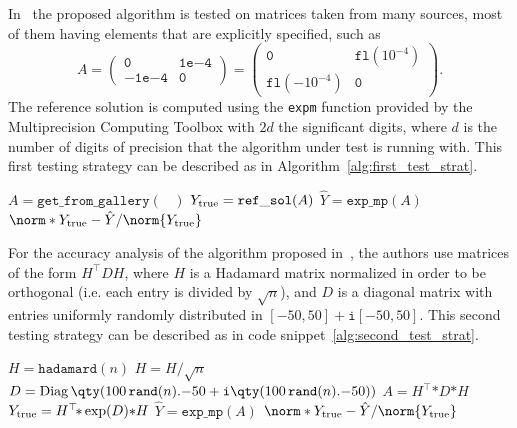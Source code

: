 In~\cite{higham:hf19_mpexpm} the proposed algorithm is tested on matrices taken from many sources, most of them having elements that are explicitly specified, such as
\begin{equation}\label{eqn:Higham_test_matrix}
	A = \begin{pmatrix}
		\mathtt{0} & \mathtt{1e{-4}}\\
		\mathtt{-1e{-4}} & \mathtt{0}
	\end{pmatrix}=
	\begin{pmatrix}
		\mathtt{0} & \mathtt{fl}(10^{-4}) \\
		\mathtt{fl}(-10^{-4}) & \mathtt{0}
	\end{pmatrix}.
\end{equation}
The reference solution is computed using  the \texttt{expm} function provided by the Multiprecision Computing Toolbox with $2d$ the significant digits, where $d$ is the number of digits of precision that the algorithm under test is running with. This first testing strategy can be described as in Algorithm~\ref{alg:first_test_strat}. 
\begin{algorithm}[H]
	\caption{\emph{First testing strategy}}
	\label{alg:first_test_strat}
	\begin{algorithmic}[1]
		\State $A = \mathtt{get\_from\_gallery}(\phantom{X})$ 
		\State $Y_{\textup{true}} = \mathtt{ref\_sol}(A)$	
		\State $\hat{Y} = \mathtt{exp\_mp}(A)$
		\State \Return $\norm*{Y_{\textup{true}}-\hat{Y}}/\norm{Y_{\textup{true}}}$
	\end{algorithmic}
\end{algorithm}

For the accuracy analysis of the algorithm proposed in~\cite{exptayotf18}, the authors use matrices of the form $H^{\top}DH$, where $H$ is a Hadamard matrix normalized in order to be orthogonal (i.e. each entry is divided by $\sqrt{n}$), and $D$ is a diagonal matrix with entries uniformly randomly distributed in $[-50,50] + \mathtt{i}[-50,50]$. This second testing strategy can be described as in code snippet~\ref{alg:second_test_strat}.
\begin{algorithm}[H]
	\caption{\emph{Second testing strategy}}
	\label{alg:second_test_strat}
	\begin{algorithmic}[1]
		\State $H = \mathtt{hadamard}(n)$
		\State $H = H / \sqrt{n}$
		\State $D = \operatorname{Diag}\qty(100\,\mathtt{rand}(n)\mathtt{.-}50 + \mathtt{i}\qty(100\,\mathtt{rand}(n)\mathtt{.-}50))$
		\State $A = H^{\top}\!\mathtt{*}D\mathtt{*}H$ 
		\Statex
		\State $Y_{\textup{true}} = H^{\top}\!\mathtt{*}\exp(D)\mathtt{*}H$
		\State $\hat{Y} = \mathtt{exp\_mp}(A)$
		\State \Return $\norm*{Y_{\textup{true}}-\hat{Y}}/\norm{Y_{\textup{true}}}$
	\end{algorithmic}
\end{algorithm}


